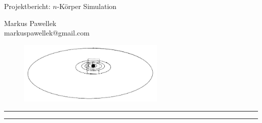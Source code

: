 \documentclass[11pt,fleqn,twoside,a4paper]{article}
\begin{document}
  \pagestyle{titlestyle}
  {\LARGE\bfseries \begin{center}{Projektbericht: $n$-Körper Simulation}\end{center}}
  \bigskip
  \begin{minipage}[t][][c]{0.45\textwidth}
  \end{minipage}
  \hfill
  \begin{minipage}[t][][c]{0.45\textwidth}
    \raggedright{Markus Pawellek \\ markuspawellek@gmail.com}
  \end{minipage}
  \bigskip
  \begin{figure}[H]
    \center
    \includegraphics[height=3.0cm]{pictures/cover_image.jpg}
  \end{figure}
  \bigskip
  \hrule
  \medskip
  \begin{abstract}
    \itshape
    
  \end{abstract}
  \medskip
  \hrule
  \bigskip
  \tableofcontents
  \bigskip
  \bigskip
  \bigskip
  \newpage
  \null
  \newpage
  \restoregeometry

  \pagestyle{mainstyle}
  \setcounter{page}{1}
  \thispagestyle{titleheadstyle}
  
  \begin{multicols}{2}
    
    
    
    
    
  \end{multicols}
\end{document}

